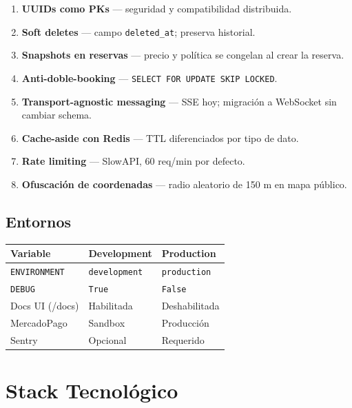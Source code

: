 \documentclass[12pt,a4paper]{report}
\begin{document}
\begin{enumerate}[leftmargin=*, label=\textbf{\arabic*.}]
  \item \textbf{UUIDs como PKs} --- seguridad y compatibilidad distribuida.
  \item \textbf{Soft deletes} --- campo \texttt{deleted\_at}; preserva historial.
  \item \textbf{Snapshots en reservas} --- precio y pol\'itica se congelan al crear la reserva.
  \item \textbf{Anti-doble-booking} --- \texttt{SELECT FOR UPDATE SKIP LOCKED}.
  \item \textbf{Transport-agnostic messaging} --- SSE hoy; migraci\'on a WebSocket sin cambiar schema.
  \item \textbf{Cache-aside con Redis} --- TTL diferenciados por tipo de dato.
  \item \textbf{Rate limiting} --- SlowAPI, 60 req/min por defecto.
  \item \textbf{Ofuscaci\'on de coordenadas} --- radio aleatorio de 150 m en mapa p\'ublico.
\end{enumerate}

\section{Entornos}

\begin{center}
\begin{tabular}{L{4.5cm} L{3cm} L{3.5cm}}
\toprule
\textbf{Variable} & \textbf{Development} & \textbf{Production} \\
\midrule
\texttt{ENVIRONMENT} & \texttt{development} & \texttt{production} \\
\texttt{DEBUG} & \texttt{True} & \texttt{False} \\
Docs UI (/docs) & Habilitada & Deshabilitada \\
MercadoPago & Sandbox & Producci\'on \\
Sentry & Opcional & Requerido \\
\bottomrule
\end{tabular}
\end{center}

\chapter{Stack Tecnol\'ogico}
\end{document}
